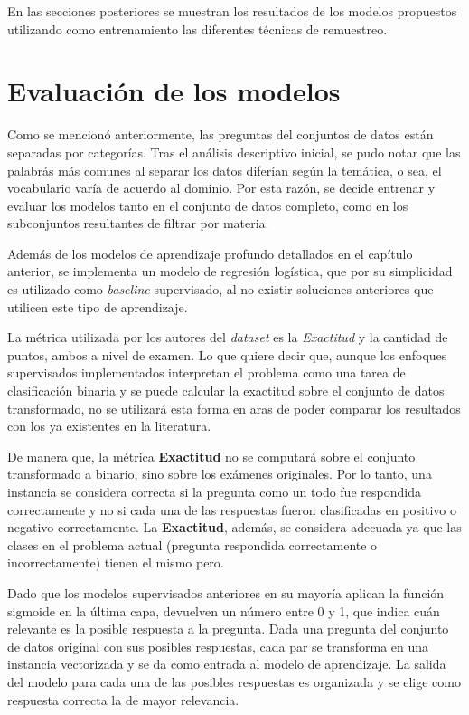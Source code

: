 En las secciones posteriores se muestran los resultados de los modelos propuestos utilizando como entrenamiento las diferentes técnicas de remuestreo.

\section{Evaluación de los modelos}

Como se mencionó anteriormente, las preguntas del conjuntos de datos están separadas por categorías. Tras el análisis descriptivo inicial, se pudo notar que las palabrás más comunes al separar los datos diferían según la temática, o sea, el vocabulario varía de acuerdo al dominio. Por esta razón, se decide entrenar y evaluar los modelos tanto en el conjunto de datos completo, como en los subconjuntos resultantes de filtrar por materia.

Además de los modelos de aprendizaje profundo detallados en el capítulo anterior, se implementa un modelo de regresión logística, que por su simplicidad es utilizado como \textit{baseline} supervisado, al no existir soluciones anteriores que utilicen este tipo de aprendizaje.

La métrica utilizada por los autores del \textit{dataset} es la \textit{Exactitud} y la cantidad de puntos, ambos a nivel de examen. Lo que quiere decir que, aunque los enfoques supervisados implementados interpretan el problema como una tarea de clasificación binaria y se puede calcular la exactitud sobre el conjunto de datos transformado, no se utilizará esta forma en aras de poder comparar los resultados con los ya existentes en la literatura. 

De manera que, la métrica \textbf{Exactitud} no se computará sobre el conjunto transformado a binario, sino sobre los exámenes originales. Por lo tanto, una instancia se considera correcta si la pregunta como un todo fue respondida correctamente y no si cada una de las respuestas fueron clasificadas en positivo o negativo correctamente. La \textbf{Exactitud}, además, se considera adecuada ya que las clases en el problema actual (pregunta respondida correctamente o incorrectamente) tienen el mismo pero.

Dado que los modelos supervisados anteriores en su mayoría aplican la función sigmoide en la última capa, devuelven un número entre 0 y 1, que indica cuán relevante es la posible respuesta a la pregunta. Dada una pregunta del conjunto de datos original con sus posibles respuestas, cada par se transforma en una instancia vectorizada y se da como entrada al modelo de aprendizaje. La salida del modelo para cada una de las posibles respuestas es organizada y se elige como respuesta correcta la de mayor relevancia.


